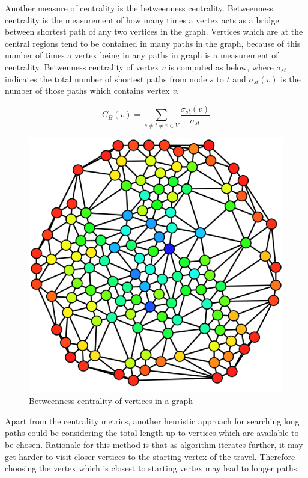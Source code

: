\documentclass[12pt]{report}
\newcommand\ddfrac[2]{\frac{\displaystyle #1}{\displaystyle #2}}
\begin{document}
            Another measure of centrality is the betweenness centrality. Betweenness centrality is the measurement of how many times a vertex acts as a bridge between shortest 
            path of any two vertices in the graph. Vertices which are at the central regions tend to be contained in many paths in the graph, because of this number of times a
            vertex being in any paths in graph is a measurement of centrality. Betwenness centrality of vertex $v$ is computed as below, where $\sigma_{st}$ indicates the total
            number of shortest paths from node $s$ to $t$ and $\sigma_{st}(v)$ is the number of those paths which contains vertex $v$.

            \bigskip
            \begin{equation}
                C_B(v) = \sum_{s \neq t \neq v \in V} \ddfrac{\sigma_{st}(v)}{\sigma_{st}}
            \end{equation}
            \bigskip

            \begin{figure}[h]
                \includegraphics[scale=0.25]{betweennes-centrality}
                \centering
                \caption{Betweenness centrality of vertices in a graph}
            \end{figure}
            \bigskip

            Apart from the centrality metrics, another heuristic approach for searching long paths could be considering the total length up to vertices which are available to be chosen.
            Rationale for this method is that as algorithm iterates further, it may get harder to visit closer vertices to the starting vertex of the travel. 
            Therefore choosing the vertex which is closest to starting vertex may lead to longer paths.
            
\end{document}
